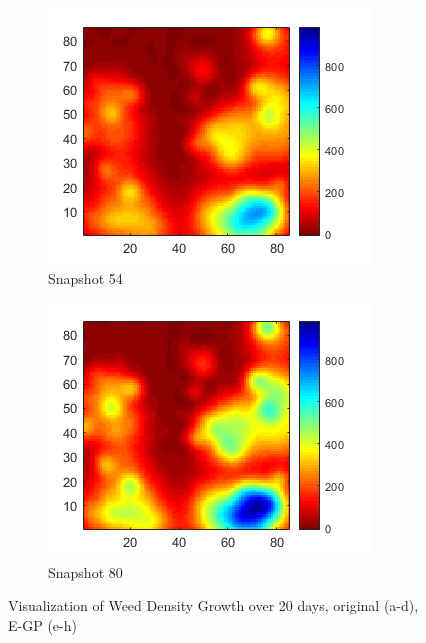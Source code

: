 \documentclass[letterpaper,12pt,peerreviewca,draftcls]{IEEEtran}
\begin{document}
\begin{figure}[h]
\begin{subfigure}[t]{0.23\textwidth}
		\includegraphics[width=\linewidth]{"Figure 15g"}
		\caption{Snapshot 54}
	\end{subfigure}
	\begin{subfigure}[t]{0.23\textwidth}
		\includegraphics[width=\linewidth]{"Figure 15h"}
		\caption{Snapshot 80}
	\end{subfigure}
	
	\caption{Visualization of Weed Density Growth over 20 days, original (a-d), E-GP (e-h)}
	\label{fig:weed_egp}
\end{figure}
\end{document}
